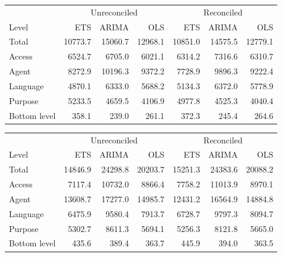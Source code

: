 \documentclass[11pt,a4paper,]{article}
\let\origtable\table
\let\endorigtable\endtable
\renewenvironment{table}[1][2] {
    \expandafter\origtable\expandafter[!htbp]
} {
    \endorigtable
}
\begin{document}
\begin{table}[!h]

\caption{\label{tab:wikipediadataresulrolling}Mean RMSE for ETS, ARIMA and OLS with and without reconciliation - Rolling origin - Wikipedia dataset}
\centering
\begin{tabular}[t]{lrrrrrr}
\toprule
\multicolumn{1}{c}{} & \multicolumn{3}{c}{Unreconciled} & \multicolumn{3}{c}{Reconciled} \\
\cmidrule(l{3pt}r{3pt}){2-4} \cmidrule(l{3pt}r{3pt}){5-7}
Level & ETS & ARIMA & OLS & ETS & ARIMA & OLS\\
\midrule
Total & 10773.7 & 15060.7 & 12968.1 & 10851.0 & 14575.5 & 12779.1\\
Access & 6524.7 & 6705.0 & 6021.1 & 6314.2 & 7316.6 & 6310.7\\
Agent & 8272.9 & 10196.3 & 9372.2 & 7728.9 & 9896.3 & 9222.4\\
Language & 4870.1 & 6333.0 & 5688.2 & 5134.3 & 6372.0 & 5778.9\\
Purpose & 5233.5 & 4659.5 & 4106.9 & 4977.8 & 4525.3 & 4040.4\\
Bottom level & 358.1 & 239.0 & 261.1 & 372.3 & 245.4 & 264.6\\
\bottomrule
\end{tabular}
\end{table}

\begin{table}

\caption{\label{tab:wikipediadataresultRMSE}Mean RMSE for ETS, ARIMA and OLS with and without reconciliation - Fixed origin - Wikipedia dataset}
\centering
\begin{tabular}[t]{lrrrrrr}
\toprule
\multicolumn{1}{c}{} & \multicolumn{3}{c}{Unreconciled} & \multicolumn{3}{c}{Reconciled} \\
\cmidrule(l{3pt}r{3pt}){2-4} \cmidrule(l{3pt}r{3pt}){5-7}
Level & ETS & ARIMA & OLS & ETS & ARIMA & OLS\\
\midrule
Total & 14846.9 & 24298.8 & 20203.7 & 15251.3 & 24383.6 & 20088.2\\
Access & 7117.4 & 10732.0 & 8866.4 & 7758.2 & 11013.9 & 8970.1\\
Agent & 13608.7 & 17277.0 & 14985.7 & 12431.2 & 16564.9 & 14884.8\\
Language & 6475.9 & 9580.4 & 7913.7 & 6728.7 & 9797.3 & 8094.7\\
Purpose & 5302.7 & 8611.3 & 5694.1 & 5256.3 & 8121.8 & 5665.0\\
Bottom level & 435.6 & 389.4 & 363.7 & 445.9 & 394.0 & 363.5\\
\bottomrule
\end{tabular}
\end{table}
\end{document}
